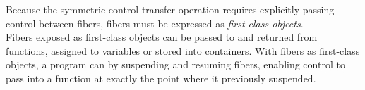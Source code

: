
Because the symmetric control-transfer operation requires explicitly passing
control between fibers, fibers must be expressed as
\emph{first-class objects}.\\

Fibers exposed as first-class objects can be passed to and returned from
functions, assigned to variables or stored into containers. With fibers as
first-class objects, a program can  by suspending and resuming fibers, enabling control to pass into a
function at exactly the point where it previously suspended.\\

